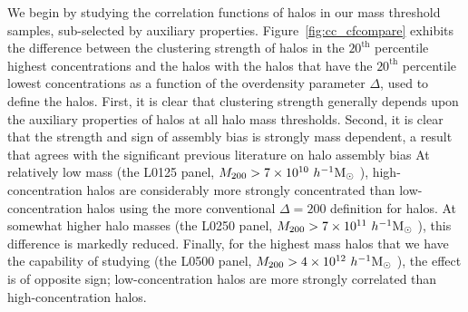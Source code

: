 \documentclass[usenatbib,usegraphicx,letterpaper]{mn2e}
\begin{document}
We begin by studying the correlation functions of halos in our mass threshold samples, sub-selected by auxiliary
properties. Figure~\ref{fig:cc_cfcompare} exhibits the difference between the clustering strength of halos in the
$20^{\mathrm{th}}$ percentile highest concentrations and the halos with the halos that have the
$20^{\mathrm{th}}$ percentile lowest concentrations as a function of the overdensity parameter $\Delta$, used to
define the halos. First, it is clear that clustering strength generally depends upon the auxiliary properties of
halos at all halo mass thresholds. Second, it is clear that the strength and sign of assembly bias is 
strongly mass dependent, a result that agrees with the significant previous literature on halo assembly bias
\citep{wechsler02, gao05, zentner07, wechsler06, harker06, croton07, dalal08, mao15, sunayama16} At relatively low mass (the L0125 panel, 
$M_{200} > 7 \times 10^{10} \ h^{-1}\mathrm{M}_{\odot}~$), high-concentration halos are considerably more strongly concentrated 
than low-concentration halos using the more 
conventional $\Delta = 200$ definition for halos. At somewhat higher halo masses (the L0250 panel, $M_{200} > 7
\times 10^{11} \ h^{-1}\mathrm{M}_{\odot}~$), this difference is markedly reduced. Finally, for the highest mass halos that we have
the capability of studying (the L0500 panel, $M_{200} > 4 \times 10^{12} \ h^{-1}\mathrm{M}_{\odot}~$), the effect is of opposite
sign; low-concentration halos are more strongly correlated than high-concentration halos.
\end{document}
